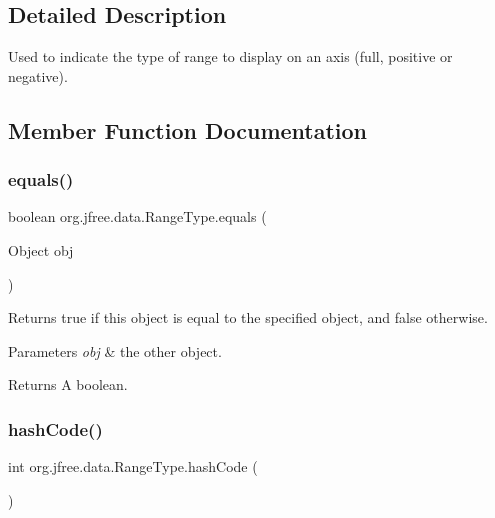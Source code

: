 \subsection{Detailed Description}
Used to indicate the type of range to display on an axis (full, positive or negative). 

\subsection{Member Function Documentation}
\mbox{\label{classorg_1_1jfree_1_1data_1_1_range_type_aa08e4da7f9c39afa72ae2e048c26c8fd}} 
\subsubsection{\texorpdfstring{equals()}{equals()}}
{\footnotesize\ttfamily boolean org.\+jfree.\+data.\+Range\+Type.\+equals (\begin{DoxyParamCaption}\item[{Object}]{obj }\end{DoxyParamCaption})}

Returns {\ttfamily true} if this object is equal to the specified object, and {\ttfamily false} otherwise.


\begin{DoxyParams}{Parameters}
{\em obj} & the other object.\\
\hline
\end{DoxyParams}
\begin{DoxyReturn}{Returns}
A boolean. 
\end{DoxyReturn}
\mbox{\label{classorg_1_1jfree_1_1data_1_1_range_type_a373313649f878f977e7206472d4d3de0}} 
\subsubsection{\texorpdfstring{hash\+Code()}{hashCode()}}
{\footnotesize\ttfamily int org.\+jfree.\+data.\+Range\+Type.\+hash\+Code (\begin{DoxyParamCaption}{ }\end{DoxyParamCaption})}

